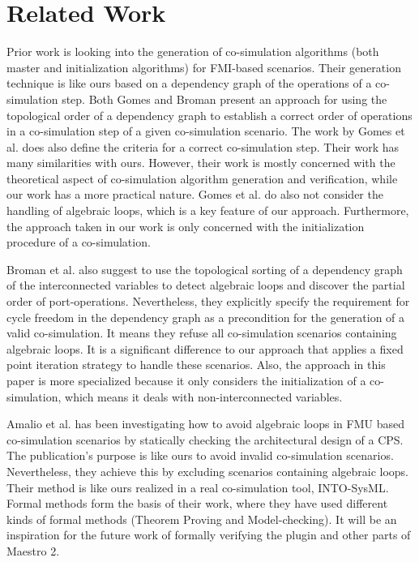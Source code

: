 \section{Related Work}
Prior work \cite{Gomes2019, BromanCompositionCo-Simulation} is looking into the generation of co-simulation algorithms (both master and initialization algorithms) for FMI-based scenarios. Their generation technique is like ours based on a dependency graph of the operations of a co-simulation step. Both Gomes and Broman present an approach for using the topological order of a dependency graph to establish a correct order of operations in a co-simulation step of a given co-simulation scenario.
The work by Gomes et al. \cite{Gomes2019} does also define the criteria for a correct co-simulation step. Their work has many similarities with ours. However, their work is mostly concerned with the theoretical aspect of co-simulation algorithm generation and verification, while our work has a more practical nature. Gomes et al. do also not consider the handling of algebraic loops, which is a key feature of our approach. Furthermore, the approach taken in our work is only concerned with the initialization procedure of a co-simulation.

Broman et al. \cite{BromanCompositionCo-Simulation} also suggest to use the topological sorting of a dependency graph of the interconnected variables to detect algebraic loops and discover the partial order of port-operations. Nevertheless, they explicitly specify the requirement for cycle freedom in the dependency graph as a precondition for the generation of a valid co-simulation. It means they refuse all co-simulation scenarios containing algebraic loops. It is a significant difference to our approach that applies a fixed point iteration strategy to handle these scenarios. Also, the approach in this paper is more specialized because it only considers the initialization of a co-simulation, which means it deals with non-interconnected variables.

Amalio et al. \cite{Amalio2016CheckingCo-simulation} has been investigating how to avoid algebraic loops in FMU based co-simulation scenarios by statically checking the architectural design of a CPS. The publication's purpose is like ours to avoid invalid co-simulation scenarios. Nevertheless, they achieve this by excluding scenarios containing algebraic loops. Their method is like ours realized in a real co-simulation tool, INTO-SysML\cite{Miyazawa2016INtegratedModelling}. Formal methods form the basis of their work, where they have used different kinds of formal methods (Theorem Proving and Model-checking). It will be an inspiration for the future work of formally verifying the plugin and other parts of Maestro 2. 
